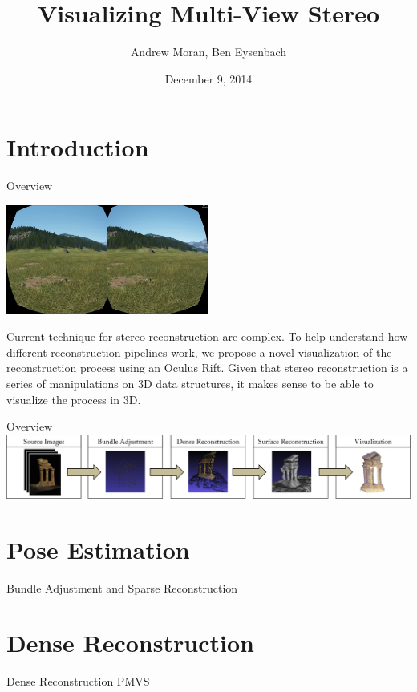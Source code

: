 \documentclass{beamer}
\begin{document}
\title{Visualizing Multi-View Stereo}
\author{Andrew Moran, Ben Eysenbach}
\date{December 9, 2014}

\frame{\titlepage}

\section{Introduction}

\begin{frame}{Overview}
  \begin{center}
    \includegraphics[width=0.5\textwidth]{rift.jpg}
  \end{center}

  Current technique for stereo reconstruction are complex. To help understand how different reconstruction pipelines work, we propose a novel visualization of the reconstruction process using an Oculus Rift. Given that stereo reconstruction is a series of manipulations on 3D data structures, it makes sense to be able to visualize the process in 3D.
\end{frame}


\begin{frame}{Overview}
  \includegraphics[width=\textwidth]{pipeline2.png}
  \tableofcontents  
\end{frame}

\section{Pose Estimation}

\begin{frame}{Bundle Adjustment and Sparse Reconstruction}
\end{frame}

\section{Dense Reconstruction}
\begin{frame}{Dense Reconstruction}
  PMVS
\end{frame}
\end{document}
